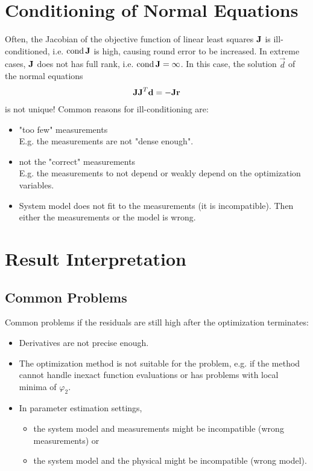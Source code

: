 	\section{Conditioning of Normal Equations}
		Often, the Jacobian of the objective function of linear least squares \( \boldsymbol{\mathrm{J}} \) is ill-conditioned, i.e. \( \operatorname{cond} \boldsymbol{\mathrm{J}} \) is high, causing round error to be increased. In extreme cases, \( \boldsymbol{\mathrm{J}} \) does not has full rank, i.e. \( \operatorname{cond} \boldsymbol{\mathrm{J}} = \infty \). In this case, the solution \( \vec{d} \) of the normal equations
		\begin{align*}
			\boldsymbol{\mathrm{J}} \boldsymbol{\mathrm{J}}^T \boldsymbol{\mathrm{d}} = -\boldsymbol{\mathrm{J}}\boldsymbol{\mathrm{r}}
		\end{align*}
		is not unique! Common reasons for ill-conditioning are:
		\begin{itemize}
			\item "too few" measurements \\ E.g. the measurements are not "dense enough".
			\item not the "correct" measurements \\ E.g. the measurements to not depend or weakly depend on the optimization variables.
			\item System model does not fit to the measurements (it is incompatible). Then either the measurements or the model is wrong.
		\end{itemize}

	\section{Result Interpretation}
		\subsection{Common Problems}
			Common problems if the residuals are still high after the optimization terminates:
			\begin{itemize}
				\item Derivatives are not precise enough.
				\item The optimization method is not suitable for the problem, e.g. if the method cannot handle inexact function evaluations or has problems with local minima of \(\varphi_2\).
				\item In parameter estimation settings,
					\begin{itemize}
						\item the system model and measurements might be incompatible (wrong measurements) or
						\item the system model and the physical might be incompatible (wrong model).
					\end{itemize}
			\end{itemize}
		
